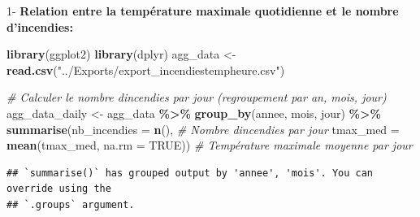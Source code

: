 \documentclass[
]{article}
\newenvironment{Shaded}{\begin{snugshade}}{\end{snugshade}}
\newcommand{\AttributeTok}[1]{\textcolor[rgb]{0.13,0.29,0.53}{#1}}
\newcommand{\CommentTok}[1]{\textcolor[rgb]{0.56,0.35,0.01}{\textit{#1}}}
\newcommand{\ConstantTok}[1]{\textcolor[rgb]{0.56,0.35,0.01}{#1}}
\newcommand{\FunctionTok}[1]{\textcolor[rgb]{0.13,0.29,0.53}{\textbf{#1}}}
\newcommand{\NormalTok}[1]{#1}
\newcommand{\OtherTok}[1]{\textcolor[rgb]{0.56,0.35,0.01}{#1}}
\newcommand{\SpecialCharTok}[1]{\textcolor[rgb]{0.81,0.36,0.00}{\textbf{#1}}}
\newcommand{\StringTok}[1]{\textcolor[rgb]{0.31,0.60,0.02}{#1}}
\begin{document}
1- \textbf{Relation entre la température maximale quotidienne et le
nombre d'incendies:}

\begin{Shaded}
\begin{Highlighting}[]
\FunctionTok{library}\NormalTok{(ggplot2)}
\FunctionTok{library}\NormalTok{(dplyr)}
\NormalTok{agg\_data }\OtherTok{\textless{}{-}} \FunctionTok{read.csv}\NormalTok{(}\StringTok{"../Exports/export\_incendiestempheure.csv"}\NormalTok{)}

\CommentTok{\# Calculer le nombre d\textquotesingle{}incendies par jour (regroupement par an, mois, jour)}
\NormalTok{agg\_data\_daily }\OtherTok{\textless{}{-}}\NormalTok{ agg\_data }\SpecialCharTok{\%\textgreater{}\%}
  \FunctionTok{group\_by}\NormalTok{(annee, mois, jour) }\SpecialCharTok{\%\textgreater{}\%}
  \FunctionTok{summarise}\NormalTok{(}\AttributeTok{nb\_incendies =} \FunctionTok{n}\NormalTok{(),   }\CommentTok{\# Nombre d\textquotesingle{}incendies par jour}
            \AttributeTok{tmax\_med =} \FunctionTok{mean}\NormalTok{(tmax\_med, }\AttributeTok{na.rm =} \ConstantTok{TRUE}\NormalTok{))   }\CommentTok{\# Température maximale moyenne par jour}
\end{Highlighting}
\end{Shaded}

\begin{verbatim}
## `summarise()` has grouped output by 'annee', 'mois'. You can override using the
## `.groups` argument.
\end{verbatim}
\end{document}
